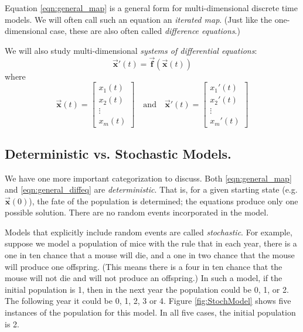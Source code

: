\documentclass[reqno]{immbook}
\newcommand{\BF}{\vec{\textbf{f}}}
\newcommand{\BX}{\vec{\textbf{x}}}
\numberwithin{equation}{chapter}
\numberwithin{question}{section}
\numberwithin{theorem}{chapter}
\numberwithin{figure}{chapter}
\theoremstyle{definition}
\begin{document}
Equation \eqref{eqn:general_map}
is a general form for multi-dimensional
discrete time models.
We will often call such an equation an
\emph{iterated map}.
 (Just like the one-dimensional
case, these are also often called \emph{difference equations}.)

We will also study multi-dimensional
\emph{systems of differential equations}:
\begin{equation}
   \BX'(t) = \BF(\BX(t))
\label{eqn:general_diffeq}
\end{equation}
where
\begin{equation}
   \BX(t) = \begin{bmatrix}x_1(t) \\ x_2(t) \\ \vdots \\ x_m(t)\end{bmatrix}
   \quad
   \textrm{and}
   \quad
   \BX'(t) = \begin{bmatrix}x_1'(t) \\ x_2'(t) \\ \vdots \\ x_m'(t)\end{bmatrix}
\end{equation}

\subsection*{Deterministic vs. Stochastic Models.}
We have one more important categorization to discuss.
Both \eqref{eqn:general_map} and \eqref{eqn:general_diffeq}
are \emph{deterministic}.
That is, for a given starting state (e.g. $\BX(0)$),
the fate of the population is determined;
the equations produce only one possible solution.
There are no random events incorporated in the model.

Models that explicitly include random events are 
called \emph{stochastic}.
For example, suppose we model a population of mice
with the rule that in each year, there is a one in ten
chance that a mouse will die, and a one in two chance that
the mouse will produce one offspring.
(This means there is a four in ten chance that the mouse
will not die and will not produce an offspring.)
In such a model, if the initial population is 1, then
in the next year the population could be 0, 1, or 2.
The following year it could be 0, 1, 2, 3 or 4.
Figure \ref{fig:StochModel} shows five instances of
the population for this model. In all five cases,
the initial population is 2.
\end{document}
